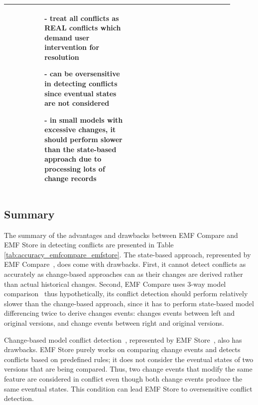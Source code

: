 \begin{table}[]
\begin{tabular}{|p{0.1\linewidth}|p{0.4\linewidth}|p{0.4\linewidth}|}
\begin{minipage}[t]{\linewidth}
\begin{itemize}[leftmargin=9pt]
			\item[]
		\end{itemize}
	\end{minipage}
	&
	\begin{minipage}[t]{\linewidth}
		\raggedright
		\begin{itemize}[leftmargin=9pt]
			\setlength\itemsep{2pt}
			\item[-] treat all conflicts as \textsf{REAL} conflicts which demand user intervention for resolution
			\item[-] can be oversensitive in detecting conflicts since eventual states are not considered
			\item[-] in small models with excessive changes, it should perform slower than the state-based approach due to processing lots of change records
			\item[]
		\end{itemize} 
	\end{minipage}
	\\
	\hline                         
\end{tabular}
\end{table}

\subsection{Summary}
\label{sec:summary}
The summary of the advantages and drawbacks between EMF Compare and EMF Store in detecting conflicts are presented in Table \ref{tab:accuracy_emfcompare_emfstore}. The state-based approach, represented by EMF Compare~\cite{emfcompare2018developer}, does come with drawbacks. First, it cannot detect conflicts as accurately as change-based approaches can as their changes are derived rather than actual historical changes. Second, EMF Compare uses 3-way model comparison~\cite{emfcompare2018developer} thus hypothetically, its conflict detection should perform relatively slower than the change-based approach, since it has to perform state-based model differencing twice to derive changes events: changes events between left and original versions, and change events between right and original versions. 

Change-based model conflict detection~\cite{koegel2010operation}, represented by EMF Store~\cite{emfstore2019what}, also has drawbacks. EMF Store purely works on comparing change events and detects conflicts based on predefined rules; it does not consider the eventual states of two versions that are being compared. Thus, two change events that modify the same feature are considered in conflict even though both change events produce the same eventual states. This condition can lead EMF Store to oversensitive conflict detection. 

